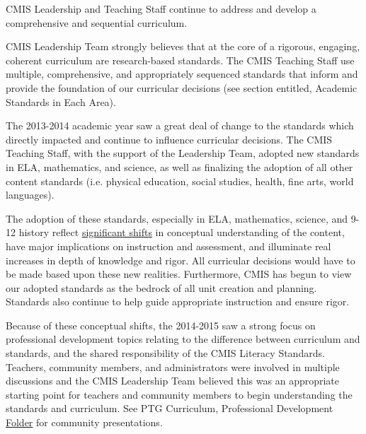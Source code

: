 \documentclass{report}
\begin{document}

\begin{findings}
CMIS Leadership and Teaching Staff continue to address and develop a comprehensive and sequential curriculum. 

\href{https://drive.google.com/drive/folders/0B71_pYxcTLo-NGJ4N0RQWXRTNE0?usp=sharing}{}

CMIS Leadership Team strongly believes that at the core of a rigorous, engaging, coherent curriculum are research-based standards. The  CMIS Teaching Staff use multiple, comprehensive, and appropriately sequenced standards that inform and provide the foundation of our curricular decisions (see section entitled, Academic Standards in Each Area). 

The 2013-2014 academic year saw a great deal of change to the standards which directly impacted and continue to influence curricular decisions. The CMIS Teaching Staff, with the support of the Leadership Team, adopted new standards in ELA, mathematics, and science, as well as finalizing the adoption of all other content standards (i.e. physical education, social studies, health, fine arts, world languages). 

The adoption of these standards, especially in ELA, mathematics, science, and 9-12 history  reflect \href{https://docs.google.com/a/cmis.ac.th/document/d/1XkW4kx-s2f5rP1zWNLqi14WBQ9fHp9aFRP2op2RPRQE/edit?usp=sharing}{significant shifts} in conceptual understanding of the content, have major implications on instruction and assessment, and illuminate real increases in depth of knowledge and rigor. All curricular decisions would have to be made based upon these new realities. Furthermore, CMIS has begun to view our adopted standards as the bedrock of all unit creation and planning. Standards also continue to help guide appropriate instruction and ensure rigor. 

Because of these conceptual shifts, the 2014-2015 saw a strong focus on professional development topics relating to the difference between curriculum and standards, and the shared responsibility of the CMIS Literacy Standards. Teachers, community members, and administrators were involved in multiple discussions and the CMIS Leadership Team believed this was an appropriate starting point for teachers and community members to begin understanding the standards and curriculum. See PTG Curriculum, Professional Development \href{https://drive.google.com/a/cmis.ac.th/folderview?id=0ByVFfrm0zfolWE0yenprdktGVlk&usp=sharing}{Folder} for community presentations. 


\end{findings}
\end{document}
